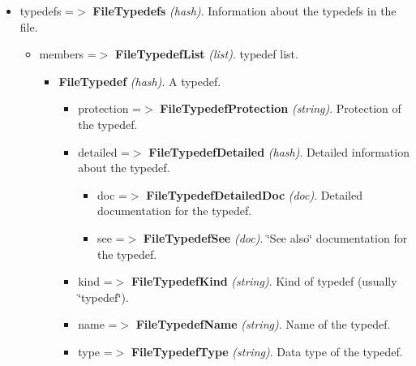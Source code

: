 \begin{itemize}
\begin{itemize}
\begin{itemize}
\begin{itemize}
\begin{itemize}
\begin{itemize}
\end{itemize}
\end{itemize}
\item typedefs =$>$ {\bf FileTypedefs} {\em (hash)\/}. Information about the typedefs in the file. \begin{itemize}
\item members =$>$ {\bf FileTypedefList} {\em (list)\/}. typedef list. \begin{itemize}
\item {\bf FileTypedef} {\em (hash)\/}. A typedef. \begin{itemize}
\item protection =$>$ {\bf FileTypedefProtection} {\em (string)\/}. Protection of the typedef. \item detailed =$>$ {\bf FileTypedefDetailed} {\em (hash)\/}. Detailed information about the typedef. \begin{itemize}
\item doc =$>$ {\bf FileTypedefDetailedDoc} {\em (doc)\/}. Detailed documentation for the typedef. \item see =$>$ {\bf FileTypedefSee} {\em (doc)\/}. \char`\"{}See also\char`\"{} documentation for the typedef. \end{itemize}
\item kind =$>$ {\bf FileTypedefKind} {\em (string)\/}. Kind of typedef (usually \char`\"{}typedef\char`\"{}). \item name =$>$ {\bf FileTypedefName} {\em (string)\/}. Name of the typedef. \item type =$>$ {\bf FileTypedefType} {\em (string)\/}. Data type of the typedef. \end{itemize}
\end{itemize}
\end{itemize}
\end{itemize}
\end{itemize}
\end{itemize}
\end{itemize}
